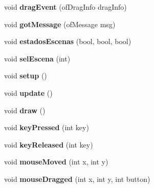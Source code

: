 \begin{DoxyCompactItemize}
\item 
\hypertarget{classof_app_aada5a79556321801567752a0e5a69bda}{}void {\bfseries drag\+Event} (of\+Drag\+Info drag\+Info)\label{classof_app_aada5a79556321801567752a0e5a69bda}

\item 
\hypertarget{classof_app_a885672a72340a5e998af1d16718dc766}{}void {\bfseries got\+Message} (of\+Message msg)\label{classof_app_a885672a72340a5e998af1d16718dc766}

\item 
\hypertarget{classof_app_aa2a2572523fa300395395b1a7ec88e05}{}void {\bfseries estados\+Escenas} (bool, bool, bool)\label{classof_app_aa2a2572523fa300395395b1a7ec88e05}

\item 
\hypertarget{classof_app_a2a1b38d864089ce7aad3b04d13c72f0a}{}void {\bfseries sel\+Escena} (int)\label{classof_app_a2a1b38d864089ce7aad3b04d13c72f0a}

\item 
\hypertarget{classof_app_af68eaa1366244f7a541cd08e02199c12}{}void {\bfseries setup} ()\label{classof_app_af68eaa1366244f7a541cd08e02199c12}

\item 
\hypertarget{classof_app_afef41ea4aee5a22ea530afba33ae7a7b}{}void {\bfseries update} ()\label{classof_app_afef41ea4aee5a22ea530afba33ae7a7b}

\item 
\hypertarget{classof_app_a75dd45437b9e317db73d8daef1ad49f8}{}void {\bfseries draw} ()\label{classof_app_a75dd45437b9e317db73d8daef1ad49f8}

\item 
\hypertarget{classof_app_a957d3197364bbac8e67eaa4f15b28ad3}{}void {\bfseries key\+Pressed} (int key)\label{classof_app_a957d3197364bbac8e67eaa4f15b28ad3}

\item 
\hypertarget{classof_app_aa1503a87453bcfdd395fe4acca5d91a0}{}void {\bfseries key\+Released} (int key)\label{classof_app_aa1503a87453bcfdd395fe4acca5d91a0}

\item 
\hypertarget{classof_app_a158b41a606310db4633fdb817b21047c}{}void {\bfseries mouse\+Moved} (int x, int y)\label{classof_app_a158b41a606310db4633fdb817b21047c}

\item 
\hypertarget{classof_app_a1ec53d1be799dc275806ff6c6548cd83}{}void {\bfseries mouse\+Dragged} (int x, int y, int button)\label{classof_app_a1ec53d1be799dc275806ff6c6548cd83}


\end{DoxyCompactItemize}
